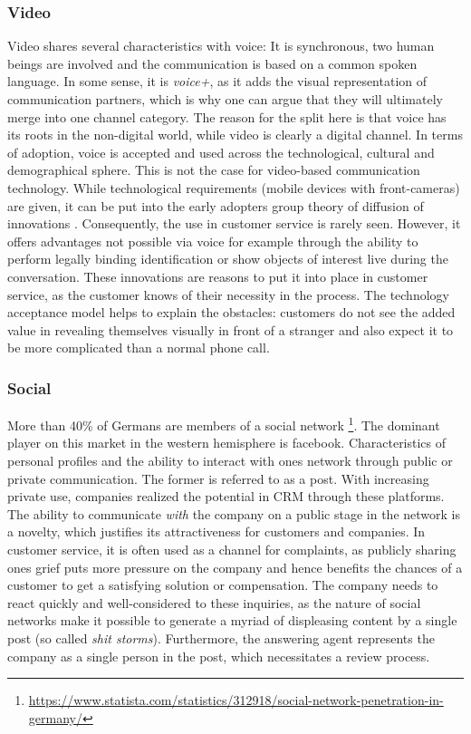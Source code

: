 		\subsubsection{Video}
		Video shares several characteristics with voice: It is synchronous, two human beings are involved and the communication is based on a common spoken language. In some sense, it is \textit{voice+}, as it adds the visual representation of communication partners, which is why one can argue that they will ultimately merge into one channel category. The reason for the split here is that voice has its roots in the non-digital world, while video is clearly a digital channel. In terms of adoption, voice is accepted and used across the technological, cultural and demographical sphere. This is not the case for video-based communication technology. While technological requirements (\ie mobile devices with front-cameras)  are given, it can be put into the early adopters group \wrt theory of diffusion of innovations \citep{rogers2010diffusion}. Consequently, the use in customer service is rarely seen. However, it offers advantages not possible via voice for example through the ability to perform legally binding identification or show objects of interest live during the conversation. These innovations are reasons to put it into place in customer service, as the customer knows of their necessity in the process. The technology acceptance model \citep{Adams_1992} helps to explain the obstacles: customers do not see the added value in revealing themselves visually in front of a stranger and also expect it to be more complicated than a normal phone call. 
		
		\subsubsection{Social}
		
		More than 40\% of Germans are members of a social network \footnote{\cf \url{https://www.statista.com/statistics/312918/social-network-penetration-in-germany/}}. The dominant player on this market in the western hemisphere is facebook. Characteristics of personal profiles and the ability to interact with ones network through public or private communication. The former is referred to as a post. With increasing private use, companies realized the potential in \acrshort{CRM} through these platforms. The ability to communicate \textit{with} the company on a public stage in the network is a novelty, which justifies its attractiveness for customers and companies. In customer service, it is often used as a channel for complaints, as publicly sharing ones grief puts more pressure on the company and hence benefits the chances of a customer to get a satisfying solution or compensation. The company needs to react quickly and well-considered to these inquiries, as the nature of social networks make it possible to generate a myriad of displeasing content by a single post (so called \textit{shit storms}). Furthermore, the answering agent represents the company as a single person in the post, which necessitates a review process. 
		
